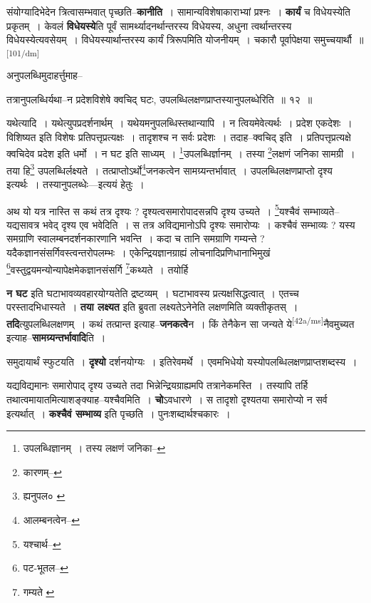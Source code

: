 \documentclass[article,12pt,a4paper]{memoir}
\begin{document}
	  \pstart संयोग्यादिभेदेन त्रित्वासम्भवात् पृच्छति--\textbf{कानीति} । सामान्यविशेषाकाराभ्यां प्रश्नः । \textbf{कार्यं} च विधेयस्येति प्रकृतम् । केवलं \textbf{विधेयस्ये}ति पूर्वं सामर्थ्यादनर्थान्तरस्य विधेयस्य, अधुना त्वर्थान्तरस्य विधेयस्येत्यवसेयम् । विधेयस्यार्थान्तरस्य कार्यं त्रिरूपमिति योजनीयम् । चकारौ पूर्वापेक्षया समुच्चयार्थौ ॥
	\pend
      \leavevmode\textsuperscript{\rmlatinfont\tiny [101/dm]}

	  \pstart अनुपलब्धिमुदाहर्त्तुमाह--
	\pend
       

	  \pstart तत्रानुपलब्धिर्यथा--न प्रदेशविशेषे क्वचिद् घटः, उपलब्धिलक्षणप्राप्तस्यानुपलब्धेरिति ॥ १२ ॥
	\pend
       

	  \pstart यथेत्यादि । यथेत्युपप्रदर्शनार्थम् । यथेयमनुपलब्धिस्तथान्यापि । न त्वियमेवेत्यर्थः । प्रदेश एकदेशः । विशिष्यत इति विशेषः प्रतिपत्तृप्रत्यक्षः । तादृशश्च न सर्वः प्रदेशः । तदाह--क्वचिद् इति । प्रतिपत्तृप्रत्यक्षे क्वचिदेव प्रदेश इति धर्मो । न घट इति साध्यम् । \footnote{उपलब्धिज्ञानम् । तस्य लक्षणं जनिका--\cite{dp-msA}}उपलब्धिर्ज्ञानम् । तस्या \footnote{कारणम्--\cite{dp-msD-n}}लक्षणं जनिका सामग्री । तया हि\footnote{ह्यनुपल० \cite{dp-edH}} उपलब्धिर्लक्ष्यते । तत्प्राप्तोऽर्थो\footnote{आलम्बनत्वेन--\cite{dp-msD-n}}जनकत्वेन सामग्र्यन्तर्भावात् । उपलब्धिलक्षणप्राप्तो दृश्य इत्यर्थः । तस्यानुपलब्धेः—इत्ययं हेतुः ।
	\pend
       

	  \pstart अथ यो यत्र नास्ति स कथं तत्र दृश्यः ? दृश्यत्वसमारोपादसन्नपि दृश्य उच्यते । \footnote{यश्चार्थ--\cite{dp-msD-n}}यश्चैवं सम्भाव्यते--यद्यसावत्र भवेद् दृश्य एव भवेदिति । स तत्र अविद्यमानोऽपि दृश्यः समारोप्यः । कश्चैवं सम्भाव्यः ? यस्य समग्राणि स्वालम्बनदर्शनकारणानि भवन्ति । कदा च तानि समग्राणि गम्यन्ते ? यदैकज्ञानसंसर्गिवस्त्वन्तरोपलम्भः । एकेन्द्रियज्ञानग्राह्यं लोचनादिप्रणिधानाभिमुखं \footnote{पट-भूतल--\cite{dp-msD-n}}वस्तुद्वयमन्योन्यापेक्षमेकज्ञानसंसर्गि \footnote{गम्यते \cite{dp-msB}}कथ्यते । तयोर्हि
	\pend
      

	  \pstart \textbf{न घट} इति घटाभावव्यवहारयोग्यतेति द्रष्टव्यम् । घटाभावस्य प्रत्यक्षसिद्धत्वात् । एतच्च परस्तादभिधास्यते । \textbf{तया लक्ष्यत} इति ब्रुवता लक्ष्यतेऽनेनेति लक्षणमिति व्यक्तीकृतस् । \textbf{तदि}त्युपलब्धिलक्षणम् । कथं तत्प्रान्त इत्याह--\textbf{जनकत्वे}न । किं तेनैकेन सा जन्यते ये\leavevmode\textsuperscript{\rmlatinfont\tiny [42a/ms]}नैवमुच्यत इत्याह--\textbf{सामग्र्यन्तर्भावादि}ति ।
	\pend
      

	  \pstart समुदायार्थं स्फुटयति । \textbf{दृश्यो} दर्शनयोग्यः । इतिरेवमर्थे । एवमभिधेयो यस्योपलब्धिलक्षणप्राप्तशब्दस्य ।
	\pend
      

	  \pstart यद्यविद्यमानः समारोपाद् दृश्य उच्यते तदा भिन्नेन्द्रियग्राह्यमपि तत्रानेकमस्ति । तस्यापि तर्हि तथात्वमायातमित्याशङ्क्याह--यश्चैवमिति । \textbf{चो}ऽवधारणे । स तादृशो दृश्यतया समारोप्यो न सर्व इत्यर्थात् । \textbf{कश्चैवं सम्भाव्य} इति पृच्छति । पुनःशब्दार्थश्चकारः ।
	\pend
      
\end{document}
